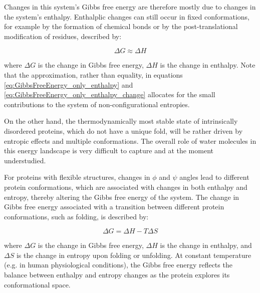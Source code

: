
Changes in this system's Gibbs free energy are therefore mostly due to changes in the system's enthalpy. Enthalplic changes can still occur in fixed conformations, for example by the formation of chemical bonds or by the post-translational modification of residues, described by:

\begin{equation}
\label{eq:GibbsFreeEnergy_only_enthalpy_change}
\Delta G \approx \Delta H
\end{equation}

where \(\Delta G\) is the change in Gibbs free energy, \(\Delta H\) is the change in enthalpy. Note that the approximation, rather than equality, in equations \ref{eq:GibbsFreeEnergy_only_enthalpy} and \ref{eq:GibbsFreeEnergy_only_enthalpy_change} allocates for the small contributions to the system of non-configurational entropies.

On the other hand, the thermodynamically most stable state of intrinsically disordered proteins, which do not have a unique fold, will be rather driven by entropic effects and multiple conformations. The overall role of water molecules in this energy landscape is very difficult to capture and at the moment understudied.

For proteins with flexible structures, changes in \(\phi\) and \(\psi\) angles lead to different protein conformations, which are associated with changes in both enthalpy and entropy, thereby altering the Gibbs free energy of the system. The change in Gibbs free energy associated with a transition between different protein conformations, such as folding, is described by:

\begin{equation}
\label{eq:GibbsFreeEnergyChange}
\Delta G = \Delta H - T \Delta S
\end{equation}

where \(\Delta G\) is the change in Gibbs free energy, \(\Delta H\) is the change in enthalpy, and \(\Delta S\) is the change in entropy upon folding or unfolding. At constant temperature (e.g. in human physiological conditions), the Gibbs free energy reflects the balance between enthalpy and entropy changes as the protein explores its conformational space.


